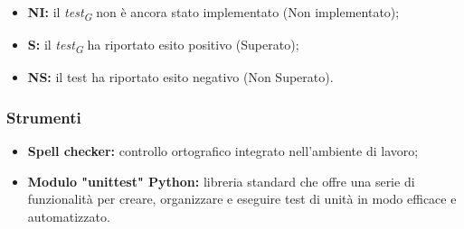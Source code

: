 \begin{itemize}
    \item \textbf{NI:} 
        il \textit{test}\textsubscript{\textit{G}} non è ancora stato implementato (Non implementato); 
    \item \textbf{S:} 
        il \textit{test}\textsubscript{\textit{G}} ha riportato esito positivo (Superato); 
    \item \textbf{NS:}
        il test ha riportato esito negativo (Non Superato).
\end{itemize}

\hypertarget{subsubsec:strumentiVerifica}{\subsubsection{Strumenti}}
\begin{itemize}
    \item \textbf{Spell checker:} 
        controllo ortografico integrato nell’ambiente di lavoro;
    \item \textbf{Modulo "unittest" Python:} libreria standard che offre una serie di funzionalità per creare, organizzare e eseguire test di unità in modo efficace e automatizzato.
\end{itemize}